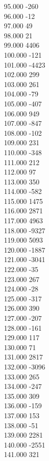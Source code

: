 { 95.000	-260 \\
 96.000	-12 \\
 97.000	49 \\
 98.000	21 \\
 99.000	4406 \\
 100.000	-121 \\
 101.000	-4423 \\
 102.000	299 \\
 103.000	261 \\
 104.000	-79 \\
 105.000	-407 \\
 106.000	949 \\
 107.000	-847 \\
 108.000	-102 \\
 109.000	231 \\
 110.000	-348 \\
 111.000	212 \\
 112.000	97 \\
 113.000	350 \\
 114.000	-582 \\
 115.000	1475 \\
 116.000	2871 \\
 117.000	4963 \\
 118.000	-9327 \\
 119.000	5093 \\
 120.000	-1887 \\
 121.000	-3041 \\
 122.000	-35 \\
 123.000	267 \\
 124.000	-28 \\
 125.000	-317 \\
 126.000	390 \\
 127.000	-207 \\
 128.000	-161 \\
 129.000	117 \\
 130.000	71 \\
 131.000	2817 \\
 132.000	-3096 \\
 133.000	265 \\
 134.000	-247 \\
 135.000	309 \\
 136.000	-159 \\
 137.000	153 \\
 138.000	-51 \\
 139.000	2281 \\
 140.000	-2551 \\
 141.000	321 \\
}
